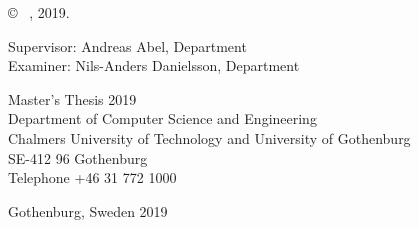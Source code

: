\copyright ~ \me, 2019. \vspace{1cm}

Supervisor: Andreas Abel, Department\\
Examiner: Nils-Anders Danielsson, Department \vspace{1cm}

Master's Thesis 2019\\	%
Department of Computer Science and Engineering\\
Chalmers University of Technology and University of Gothenburg\\
SE-412 96 Gothenburg\\
Telephone +46 31 772 1000 \vspace{0.5cm}

\vfill

Gothenburg, Sweden 2019

